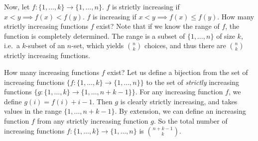 Now, let \(f\colon \{1, \dots, k\} \to \{1, \dots, n\}\).
\(f\) is strictly increasing if \(x < y \implies f(x) < f(y)\).
\(f\) is increasing if \(x < y \implies f(x) \leq f(y)\).
How many strictly increasing functions \(f\) exist?
Note that if we know the range of \(f\), the function is completely determined.
The range is a subset of \(\{1, \dots, n\}\) of size \(k\), i.e.\ a \(k\)-subset of an \(n\)-set, which yields \(\binom{n}{k}\) choices, and thus there are \(\binom{n}{k}\) strictly increasing functions.

How many increasing functions \(f\) exist?
Let us define a bijection from the set of increasing functions \(\{f\colon \{1, \dots, k\} \to \{1, \dots, n\}\}\) to the set of \textit{strictly} increasing functions \(\{g\colon \{1, \dots, k\} \to \{1, \dots, n+k-1\}\}\).
For any increasing function \(f\), we define \(g(i) = f(i) + i - 1\).
Then \(g\) is clearly strictly increasing, and takes values in the range \(\{1, \dots, n+k-1\}\).
By extension, we can define an increasing function \(f\) from any strictly increasing function \(g\).
So the total number of increasing functions \(f\colon \{1, \dots, k\} \to \{1, \dots, n\}\) is \(\binom{n+k-1}{k}\).
